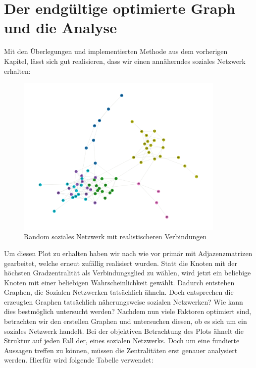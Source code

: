 \section{Der endgültige optimierte Graph und die Analyse}
Mit den Überlegungen und implementierten Methode aus dem vorherigen Kapitel, lässt sich gut realisieren, dass wir einen annäherndes soziales Netzwerk erhalten:

\FloatBarrier
\begin{figure}[h!]
    \centering
    \hspace*{-2cm}
    \includegraphics[width=0.9\textwidth]{Graphics/Random_moreConnections.png}
    \caption{Random soziales Netzwerk mit realistischeren Verbindungen}
    \label{fig:SNA}
\end{figure}

\FloatBarrier
Um diesen Plot zu erhalten haben wir nach wie vor primär mit Adjazenzmatrizen gearbeitet, welche erneut zufällig realisiert wurden. Statt die Knoten mit der höchsten Gradzentralität als Verbindungsglied zu wählen, wird jetzt ein beliebige Knoten mit einer beliebigen Wahrscheinlichkeit gewählt. Dadurch entstehen Graphen, die Sozialen Netzwerken tatsächlich ähneln.
Doch entsprechen die erzeugten Graphen tatsächlich näherungsweise sozialen Netzwerken? Wie kann dies bestmöglich untersucht werden?
Nachdem nun viele Faktoren optimiert sind, betrachten wir den erstellen Graphen und untersuchen diesen, ob es sich um ein soziales Netzwerk handelt.
Bei der objektiven Betrachtung des Plots ähnelt die Struktur auf jeden Fall der, eines sozialen Netzwerks. Doch um eine fundierte Aussagen treffen zu können, müssen die Zentralitäten erst genauer analysiert werden. Hierfür wird folgende Tabelle verwendet:

